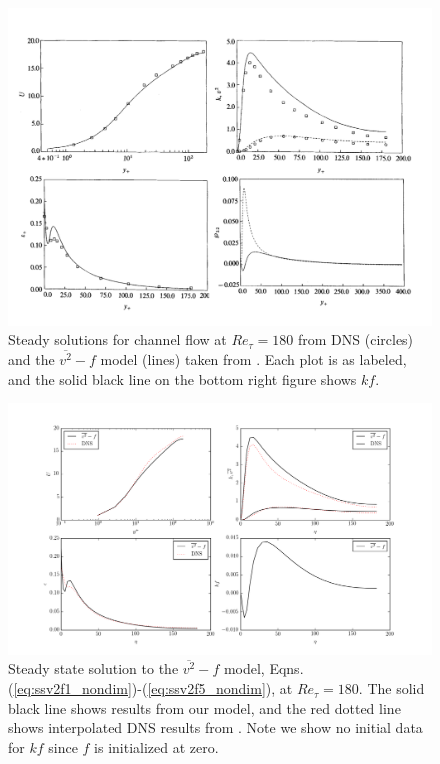 \documentclass[a4paper,11pt]{article}
\begin{document}
\begin{figure}
 \centering
 \includegraphics[width=\textwidth]{durbin180}
 \caption{Steady solutions for channel flow at $Re_\tau=180$ from DNS (circles)
and the $\overline{v^2}-f$ model (lines) taken from \cite{durbin180}. Each plot
is as labeled, and the solid black line on the bottom right figure shows $kf$.}
 \label{fig:durbin180}
\end{figure}

\begin{figure}
 \centering
 \includegraphics[width=\textwidth]{results_180}
 \caption{Steady state solution to the $\overline{v^2}-f$ model, Eqns.
(\ref{eq:ssv2f1_nondim})-(\ref{eq:ssv2f5_nondim}), at $Re_\tau=180$. The solid
black line shows results from our model, and the red dotted line shows
interpolated DNS results from \cite{Lee}. Note we show no initial data for $kf$
since $f$ is initialized at zero.}
 \label{fig:results_180}
\end{figure}
\end{document}
